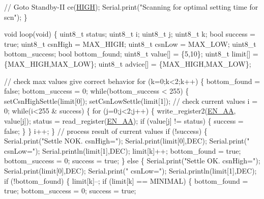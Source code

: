 \begin{DoxyCodeInclude}
  \textcolor{comment}{// Goto Standby-II}
  ce(\hyperlink{group__Porting__General_ga5bb885982ff66a2e0a0a45a8ee9c35e2}{HIGH});
  Serial.print(\textcolor{stringliteral}{"Scanning for optimal setting time for scn"});
\}


\textcolor{keywordtype}{void} loop(\textcolor{keywordtype}{void}) \{
  uint8\_t status;
  uint8\_t i;
  uint8\_t j;
  uint8\_t k;
  \textcolor{keywordtype}{bool} success = \textcolor{keyword}{true};
  uint8\_t csnHigh = MAX\_HIGH;
  uint8\_t csnLow = MAX\_LOW;
  uint8\_t bottom\_success;
  \textcolor{keywordtype}{bool} bottom\_found;
  uint8\_t value[] = \{5,10\};
  uint8\_t limit[] = \{MAX\_HIGH,MAX\_LOW\};
  uint8\_t advice[] = \{MAX\_HIGH,MAX\_LOW\};
  
  \textcolor{comment}{// check max values give correct behavior}
  \textcolor{keywordflow}{for} (k=0;k<2;k++) \{
    bottom\_found = \textcolor{keyword}{false};
    bottom\_success = 0;
    \textcolor{keywordflow}{while}(bottom\_success < 255) \{
      setCsnHighSettle(limit[0]);
      setCsnLowSettle(limit[1]);
      \textcolor{comment}{// check current values}
      i = 0;
      \textcolor{keywordflow}{while}(i<255 & success) \{
        \textcolor{keywordflow}{for} (j=0;j<2;j++) \{
          write\_register2(\hyperlink{nRF24L01_8h_aa84a282351a2c9b83dd653df6ac59216}{EN\_AA}, value[j]);
          status = read\_register(\hyperlink{nRF24L01_8h_aa84a282351a2c9b83dd653df6ac59216}{EN\_AA});
          \textcolor{keywordflow}{if} (value[j] != status) \{
            success = \textcolor{keyword}{false};
          \}
        \}
        i++;
      \}
      \textcolor{comment}{// process result of current values }
      \textcolor{keywordflow}{if} (!success) \{
        Serial.print(\textcolor{stringliteral}{"Settle NOK. csnHigh="});
        Serial.print(limit[0],DEC);
        Serial.print(\textcolor{stringliteral}{" csnLow="}); 
        Serial.println(limit[1],DEC);
        limit[k]++;
        bottom\_found = \textcolor{keyword}{true};
        bottom\_success = 0;
        success = \textcolor{keyword}{true};
      \} \textcolor{keywordflow}{else} \{
        Serial.print(\textcolor{stringliteral}{"Settle OK. csnHigh="});
        Serial.print(limit[0],DEC);
        Serial.print(\textcolor{stringliteral}{" csnLow="}); 
        Serial.println(limit[1],DEC);
        \textcolor{keywordflow}{if} (!bottom\_found) \{
          limit[k]--;
          \textcolor{keywordflow}{if} (limit[k] == MINIMAL) \{
            bottom\_found = \textcolor{keyword}{true};
            bottom\_success = 0;
            success = \textcolor{keyword}{true};

\end{DoxyCodeInclude}
